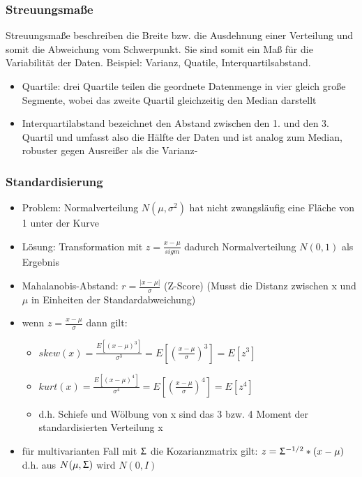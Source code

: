 \documentclass{article} %
\begin{document}
		\subsubsection{Streuungsmaße}
		Streuungsmaße beschreiben die Breite bzw. die Ausdehnung einer Verteilung und somit die Abweichung vom Schwerpunkt. Sie sind somit ein Maß für die Variabilität der Daten. Beispiel: Varianz, Quatile, Interquartilsabstand.
		\begin{itemize}
			\item Quartile: drei Quartile teilen die geordnete Datenmenge in vier gleich große Segmente, wobei das zweite Quartil gleichzeitig den Median darstellt
			\item Interquartilabstand bezeichnet den Abstand zwischen den 1. und den 3. Quartil und umfasst also die Hälfte der Daten und ist analog zum Median, robuster gegen Ausreißer als die Varianz-
		\end{itemize}	
		\subsubsection{Standardisierung}
		\begin{itemize}
			\item Problem: Normalverteilung $N(\mu,\sigma^2)$ hat nicht zwangsläufig eine Fläche von 1 unter der Kurve
			\item Lösung: Transformation mit $z = \frac{x-\mu}{sigm}$ dadurch Normalverteilung $N(0,1)$ als Ergebnis
			\item Mahalanobis-Abstand: $r=\frac{|x-\mu|}{\sigma}$ (Z-Score) (Musst die Distanz zwischen x und $\mu$ in Einheiten der Standardabweichung)
			\item wenn $z=\frac{x-\mu}{\sigma}$ dann gilt:
			\begin{itemize}
				\item $skew(x) = \frac{E[(x-\mu)^3]}{\sigma^3} = E[(\frac{x-\mu}{\sigma})^3]  = E[z^3]$
				\item $kurt(x) = \frac{E[(x-\mu)^4]}{\sigma^4} = E[(\frac{x-\mu}{\sigma})^4]  = E[z^4]$
				\item d.h. Schiefe und Wölbung von x sind das 3 bzw. 4 Moment der standardisierten Verteilung x
			\end{itemize}
			\item für multivarianten Fall mit $\Upsigma$ die Kozarianzmatrix gilt: $z=\Upsigma^{-1/2}*(x-\mu)$ d.h. aus $N(\mu,\Upsigma)$ wird $N(0,I)$
		\end{itemize}
\end{document}
